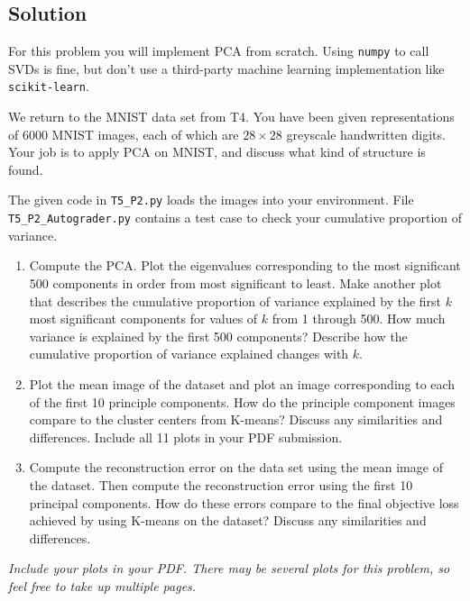 \documentclass[submit]{harvardml}
\begin{document}
\subsection*{Solution}

\newpage

\begin{problem}

For this problem you will implement PCA from scratch.  Using
\texttt{numpy} to call SVDs is fine, but don't use a third-party
machine learning implementation like \texttt{scikit-learn}.

We return to the MNIST data set from T4. You have been given
representations of 6000 MNIST images, each of which are $28\times28$
greyscale handwritten digits. Your job is to apply PCA on MNIST, and
discuss what kind of structure is found.

The given code in \texttt{T5\_P2.py} loads the images into your environment.  File \texttt{T5\_P2\_Autograder.py} contains a test case to check your cumulative proportion of variance.

\begin{enumerate}

\item Compute the PCA. Plot the eigenvalues corresponding to the most significant 500
  components in order from most significant to least. Make another plot that describes the cumulative proportion of variance explained by the first $k$ most significant components for values of $k$ from 1 through 500.
  How much variance is explained by the first 500 components?  Describe
  how the cumulative proportion of variance explained changes with $k$.

\item Plot the mean image of the dataset and plot an image corresponding to each of the
  first 10 principle components.  How do the principle component images compare to the
  cluster centers from K-means? Discuss any similarities and
  differences.  Include all 11 plots in your PDF submission.

\item Compute the reconstruction error on the data set using the mean
  image of the dataset. Then compute the reconstruction error using the first 10 principal components. How do these
  errors compare to the final objective loss achieved by using K-means on the dataset? Discuss any similarities and
  differences.

\end{enumerate}


\textit{Include your plots in your PDF. There may be several plots for this problem, so feel free
to take up multiple pages.}






\end{problem}
\end{document}
